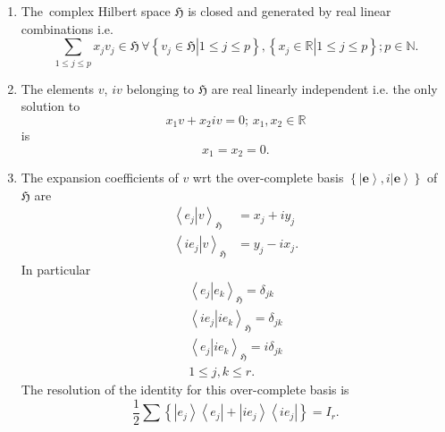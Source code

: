 \documentclass[aps,preprint]{revtex4}
\begin{document}
\begin{enumerate}
\item The\ complex Hilbert space $\mathfrak{H}$ is closed and generated by
real linear combinations i.e. 
\begin{equation}
\sum_{1\leq j\leq p}x_{j}v_{j}\in\mathfrak{H\,\forall}\left\{ \left. v_{j}\in%
\mathfrak{H}\right\vert 1\leq j\leq p\right\} ,\left\{ \left. x_{j}\in%
\mathbb{R}\right\vert 1\leq j\leq p\right\} ;p\in\mathbb{N}.
\end{equation}

\item The elements $v$, $iv$ belonging to $\mathfrak{H}$ are real linearly
independent i.e. the only solution to 
\begin{equation}
x_{1}v+x_{2}iv=0;\,x_{1},x_{2}\in\mathbb{R}
\end{equation}
is 
\begin{equation}
x_{1}=x_{2}=0.
\end{equation}

\item The expansion coefficients of $v$ wrt the over-complete basis $\left\{
\left\vert \mathbf{e}\right\rangle ,i\left\vert \mathbf{e}\right\rangle
\right\} $ of $\mathfrak{H}$ are 
\begin{align}
\left\langle \left. e_{j}\right\vert v\right\rangle _{\mathfrak{H}}&
=x_{j}+iy_{j} \\
\left\langle \left. ie_{j}\right\vert v\right\rangle _{\mathfrak{H}}&
=y_{j}-ix_{j}.
\end{align}%
In particular 
\begin{gather}
\left\langle \left. e_{j}\right\vert e_{k}\right\rangle _{\mathfrak{H}%
}=\delta _{jk} \\
\left\langle \left. ie_{j}\right\vert ie_{k}\right\rangle _{\mathfrak{H}%
}=\delta _{jk} \\
\left\langle \left. e_{j}\right\vert ie_{k}\right\rangle _{\mathfrak{H}%
}=i\delta _{jk} \\
1\leq j,k\leq r.
\end{gather}%
The resolution of the identity for this over-complete basis is 
\begin{equation}
\frac{1}{2}\sum \left\{ \left\vert e_{j}\right\rangle \left\langle
e_{j}\right\vert +\left\vert ie_{j}\right\rangle \left\langle
ie_{j}\right\vert \right\} =I_{r}.
\end{equation}


\end{enumerate}
\end{document}
